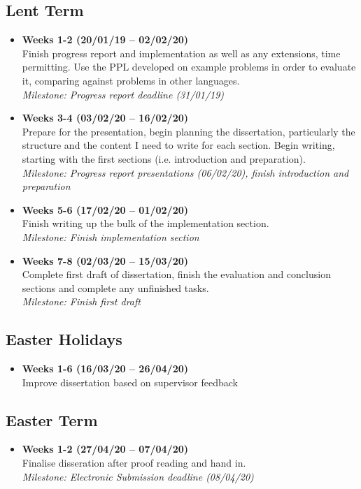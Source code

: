 \subsection*{Lent Term}
\begin{itemize}
      \item \textbf{Weeks 1-2 (20/01/19 -- 02/02/20)}\\ Finish progress report and implementation as well as any extensions, time permitting. Use the PPL developed on example problems in order to evaluate it, comparing against problems in other languages.
      \\ \textit{Milestone: Progress report deadline (31/01/19)}
      \item \textbf{Weeks 3-4 (03/02/20 -- 16/02/20)}\\ Prepare for the presentation, begin planning the dissertation, particularly the structure and the content I need to write for each section. Begin writing, starting with the first sections (i.e. introduction and preparation).
      \\ \textit{Milestone: Progress report presentations (06/02/20), finish introduction and preparation}
      \item \textbf{Weeks 5-6 (17/02/20 -- 01/02/20)}\\ Finish writing up the bulk of the implementation section.
      \\ \textit{Milestone: Finish implementation section}
      \item \textbf{Weeks 7-8 (02/03/20 -- 15/03/20)}\\ Complete first draft of dissertation, finish the evaluation and conclusion sections and complete any unfinished tasks.
      \\ \textit{Milestone: Finish first draft}
\end{itemize}
\subsection*{Easter Holidays}
\begin{itemize}
      \item \textbf{Weeks 1-6 (16/03/20 -- 26/04/20)}\\ Improve dissertation based on supervisor feedback
\end{itemize}
\subsection*{Easter Term}
\begin{itemize}
      \item \textbf{Weeks 1-2 (27/04/20 -- 07/04/20)}\\ Finalise disseration after proof reading and hand in.
      \\ \textit{Milestone: Electronic Submission deadline (08/04/20)}
\end{itemize}

